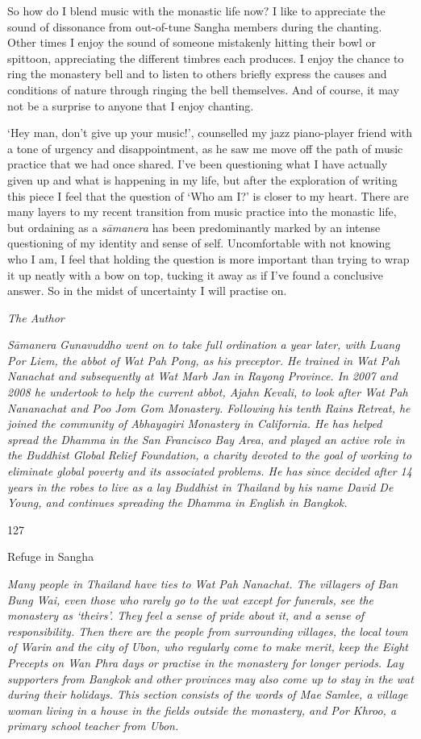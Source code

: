 So how do I blend music with the monastic life now? I like to appreciate
the sound of dissonance from out-of-tune Sangha members during the
chanting. Other times I enjoy the sound of someone mistakenly hitting
their bowl or spittoon, appreciating the different timbres each
produces. I enjoy the chance to ring the monastery bell and to listen to
others briefly express the causes and conditions of nature through
ringing the bell themselves. And of course, it may not be a surprise to
anyone that I enjoy chanting.

`Hey man, don't give up your music!', counselled my jazz piano-player
friend with a tone of urgency and disappointment, as he saw me move off
the path of music practice that we had once shared. I've been
questioning what I have actually given up and what is happening in my
life, but after the exploration of writing this piece I feel that the
question of `Who am I?' is closer to my heart. There are many layers to
my recent transition from music practice into the monastic life, but
ordaining as a \emph{sāmanera} has been predominantly marked by an
intense questioning of my identity and sense of self. Uncomfortable with
not knowing who I am, I feel that holding the question is more important
than trying to wrap it up neatly with a bow on top, tucking it away as
if I've found a conclusive answer. So in the midst of uncertainty I will
practise on.

\emph{ The Author}

\emph{Sāmanera} \emph{Gunavuddho went on to take full ordination a year
later, with Luang Por Liem, the abbot of Wat Pah Pong, as his preceptor.
He trained in Wat Pah Nanachat and subsequently at Wat Marb Jan in
Rayong Province. In 2007 and 2008 he undertook to help the current
abbot, Ajahn Kevali, to look after Wat Pah Nananachat and Poo Jom Gom
Monastery. Following his tenth Rains Retreat, he joined the community of
Abhayagiri Monastery in California. He has helped spread the Dhamma in
the San Francisco Bay Area, and played an active role in the Buddhist
Global Relief Foundation, a charity devoted to the goal of working to
eliminate global poverty and its associated problems. He has since
decided after 14 years in the robes to live as a lay Buddhist in
Thailand by his name David De Young, and continues spreading the Dhamma
in English in Bangkok.}

127

Refuge in Sangha

\emph{Many people in Thailand have ties to Wat Pah Nanachat. The
villagers of Ban Bung Wai, even those who rarely go to the wat except
for funerals, see the monastery as `theirs'. They feel a sense of pride
about it, and a sense of responsibility. Then there are the people from
surrounding villages, the local town of Warin and the city of Ubon, who
regularly come to make merit, keep the Eight Precepts on Wan Phra days
or practise in the monastery for longer periods. Lay supporters from
Bangkok and other provinces may also come up to stay in the wat during
their holidays. This section consists of the words of Mae Samlee, a
village woman living in a house in the fields outside the monastery, and
Por Khroo, a primary school teacher from Ubon.}

